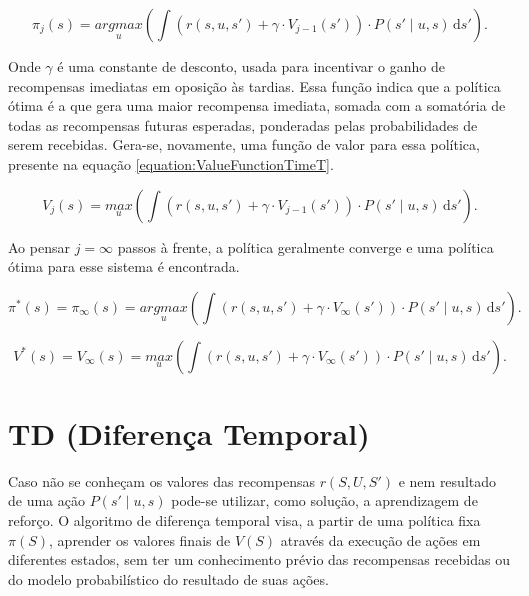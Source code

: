 \begin{equation}
    \pi_j \left( s \right) = \underset{u}{argmax} \left( \int \! \left( r \left( s, u, s' \right) + \gamma \cdot V_{j-1} \left( s' \right) \right) \cdot P \left( s' \mid u, s \right) \, \mathrm{d}s' \right).
\end{equation}

Onde $ \gamma $ é uma constante de desconto, usada para incentivar o ganho de recompensas imediatas em oposição às tardias. Essa função indica que a política ótima é a que gera uma maior recompensa imediata, somada com a somatória de todas as recompensas futuras esperadas, ponderadas pelas probabilidades de serem recebidas. Gera-se, novamente, uma função de valor para essa política, presente na equação \ref{equation:ValueFunctionTimeT}.

\begin{equation} \label{equation:ValueFunctionTimeT}
    V_j \left( s \right) = \underset{u}{max} \left( \int \! \left( r \left( s, u, s' \right) + \gamma \cdot V_{j-1} \left( s' \right) \right) \cdot P \left( s' \mid u, s \right) \, \mathrm{d}s' \right).
\end{equation}

Ao pensar $ j = \infty $ passos à frente, a política geralmente converge e uma política ótima para esse sistema é encontrada.

\begin{equation}
    \pi^* \left( s \right) = \pi_\infty \left( s \right) = \underset{u}{argmax} \left( \int \! \left( r \left( s, u, s' \right) + \gamma \cdot V_\infty \left( s' \right) \right) \cdot P \left( s' \mid u, s \right) \, \mathrm{d}s' \right).
\end{equation}

\begin{equation} \label{equation:ValueFunctionMDP}
    V^* \left( s \right) = V_\infty \left( s \right) = \underset{u}{max} \left( \int \! \left( r \left( s, u, s' \right) + \gamma \cdot V_\infty \left( s' \right) \right) \cdot P \left( s' \mid u, s \right) \, \mathrm{d}s' \right).
\end{equation}


\section{TD (Diferença Temporal)} \label{section:TD}

Caso não se conheçam os valores das recompensas $ r \left( S, U, S' \right) $ e nem resultado de uma ação $ P \left( s' \mid u, s \right) $ pode-se utilizar, como solução, a aprendizagem de reforço. O algoritmo de diferença temporal visa, a partir de uma política fixa $ \pi \left( S \right) $, aprender os valores finais de $ V \left( S \right) $ através da execução de ações em diferentes estados, sem ter um conhecimento prévio das recompensas recebidas ou do modelo probabilístico do resultado de suas ações.

